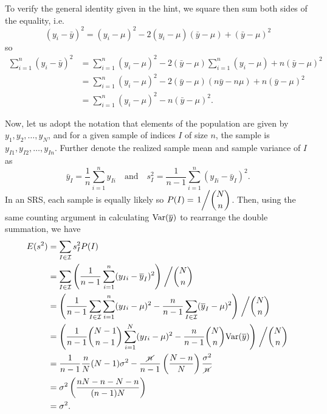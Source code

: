\documentclass{homework}
\begin{document}
\begin{solution}
  To verify the general identity given in the hint, we square then sum both sides of the equality, i.e.
  $$
    (y_i - \bar y)^2 = (y_i - \mu)^2 -2(y_i-\mu)(\bar y - \mu) + (\bar y - \mu)^2
  $$
  so
  \begin{align*}
    \sum_{i=1}^n (y_i - \bar y)^2 
    &= \sum_{i=1}^n (y_i - \mu)^2 -2(\bar y - \mu) \sum_{i=1}^n(y_i-\mu) + n(\bar y - \mu)^2 \\
    &= \sum_{i=1}^n (y_i - \mu)^2 -2(\bar y - \mu)(n\bar y-n\mu) + n(\bar y - \mu)^2 \\
    &=\sum_{i=1}^n (y_i - \mu)^2 - n(\bar y - \mu)^2.
  \end{align*}

  Now, let us adopt the notation that elements of the population are given by $y_1,y_2,\dots,y_N$, and for a given sample of indices $I$ of size $n$, the sample is $y_{I1},y_{I2},\dots,y_{In}$.  Further denote the realized sample mean and sample variance of $I$ as
  $$
    \bar y_I = \frac 1n	\sum_{i=1}^n y_{Ii}
    \quad\text{and}\quad
    s^2_I = \frac1{n-1}\sum_{i=1}^n (y_{Ii} - \bar y_I)^2.
  $$
  In an SRS, each sample is equally likely so $\displaystyle P(I) = \left. 1 \middle/ \binom N n\right.$. Then, using the same counting argument in calculating $\mathrm{Var}(\overline y)$ to rearrange the double summation, we have
  \begin{align*}
    E(s^2) &= \sum_{I \in \mathcal I} s^2_{I}P(I) \\
    &= \sum_{I \in \mathcal I} \left(\frac1{n-1}\sum_{i=1}^n (y_{Ii} - \overline y_I)^2\right)\left. \middle/ \binom Nn \right. \\
    &= \left(\frac 1{n-1}\sum_{I \in \mathcal I} \sum_{i=1}^n (y_{Ii} - \mu)^2 - \frac n{n-1} \sum_{I\in \mathcal I}(\overline y_I - \mu)^2\right)\left. \middle/ \binom Nn \right. \\
    &= \left(\frac 1{n-1}\binom{N-1}{n-1}\sum_{i=1}^N (y_{Ii} - \mu)^2 - \frac n{n-1}\binom Nn \mathrm{Var}(\overline y)\right)\left. \middle/ \binom Nn \right. \\
    &= \frac 1{n-1}\frac nN(N-1)\sigma^2 - \frac {\cancel n}{n-1}\left(\frac{N-n}{N}\right)\frac{\sigma^2}{\cancel n} \\
    &= \sigma^2\left(\frac {nN-n - N -n}{(n-1)N}\right)\\
    &= \sigma^2.
  \end{align*}


\end{solution}
\end{document}
